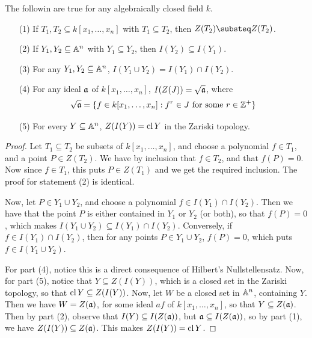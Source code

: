 \begin{lemma}\label{1.1.3}
    The followin are true for any algebraically closed field $k$.
    \begin{enumerate}
        \item[(1)] If $T_1,T_2 \subseteq k[x_1, \dots, x_n]$ with $T_1 \subseteq
            T_2$, then $Z(T_2) \substeq Z(T_2)$.

        \item[(2)] If $Y_1,Y_2 \subseteq \mathbb{A}^n$ with $Y_1 \subseteq Y_2$, then
            $I(Y_2) \subseteq I(Y_1)$.

        \item[(3)] For any $Y_1, Y_2 \subseteq \mathbb{A}^n$, $I(Y_1 \cup Y_2)=I(Y_1)
            \cap I(Y_2)$.

        \item[(4)] For any ideal $\mathfrak{a}$ of  $k[x_1, \dots, x_n]$,
            $I(Z(J))=\sqrt{\mathfrak{a}}$, where
            \begin{equation*}
                \sqrt{\mathfrak{a}}=\{f \in k[x_1, \dots, x_n] : f^r \in J \text{ for
                    some } r \in \mathbb{Z}^+\}
            \end{equation*}

        \item[(5)] For every $Y \subseteq \mathbb{A}^n$,  $Z(I(Y))=\operatorname{cl}{Y}$ in the
            Zariski topology.
    \end{enumerate}
\end{lemma}
\begin{proof}
    Let $T_1 \subseteq T_2$ be subsets of $k[x_1, \dots, x_n]$, and choose a
    polynomial $f \in T_1$, and a point $P \in Z(T_2)$. We have by inclusion
    that $f \in T_2$, and that $f(P)=0$. Now since $f \in T_1$, this puts $P \in
    Z(T_1)$ and we get the required inclusion. The proof for statement (2) is
    identical.

    Now, let $P \in Y_1 \cup Y_2$, and choose a polynomial $f \in I(Y_1) \cap
    I(Y_2)$. Then we have that the point $P$ is either contained in  $Y_1$ or
    $Y_2$ (or both), so that $f(P)=0$, which makes $I(Y_1 \cup Y_2) \subseteq
    I(Y_1) \cap I(Y_2)$. Conversely, if $f \in I(Y_1) \cap I(Y_2)$, then for any
    points $P \in Y_1 \cup Y_2$, $f(P)=0$, which puts $f \in I(Y_1 \cup Y_2)$.

    For part (4), notice this is a direct consequence of Hilbert's
    Nullstellensatz. Now, for part (5), notice that $Y \subseteq Z(I(Y))$, which
    is a closed set in the Zariski topology, so that $\operatorname{cl}{Y} \subseteq Z(I(Y))$.
    Now, let $W$ be a closed set in  $\mathbb{A}^n$, containing $Y$. Then we have
    $W=Z(\mathfrak{a})$, for some ideal $af$ of  $k[x_1, \dots, x_n]$, so that $Y \subseteq
    Z(\mathfrak{a})$. Then by part (2), observe that $I(Y) \subseteq I(Z(\mathfrak{a}))$, but $\mathfrak{a}
    \subseteq I(Z(\mathfrak{a}))$, so by part (1), we have $Z(I(Y)) \subseteq Z(\mathfrak{a})$. This
    makes $Z(I(Y))=\operatorname{cl}{Y}$.
\end{proof}
